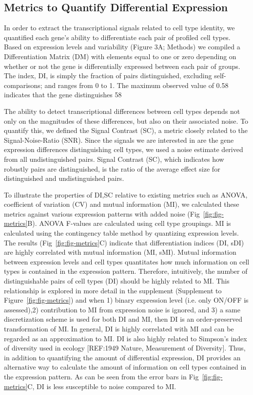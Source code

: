 \subsection{Metrics to Quantify Differential Expression}
In order to extract the transcriptional signals related to cell type identity, we quantified each gene's ability to differentiate each pair of profiled cell types. Based on expression levels and variability (Figure 3A; Methods) we compiled a Differentiation Matrix (DM) with elements equal to one or zero depending on whether or not the gene is differentially expressed between each pair of groups. The index, DI, is simply the fraction of pairs distinguished, excluding self-comparisons; and ranges from 0 to 1. The maximum observed value of 0.58 indicates that the gene distinguishes 58%

The ability to detect transcriptional differences between cell types depends not only on the magnitudes of these differences, but also on their associated noise. To quantify this, we defined the Signal Contrast (SC), a metric closely related to the Signal-Noise-Ratio (SNR). Since the signals we are interested in are the gene expression differences distinguishing cell types, we used a noise estimate derived from all undistinguished pairs. Signal Contrast (SC), which indicates how robustly pairs are distinguished, is the ratio of the average effect size for distinguished and undistinguished pairs. 

To illustrate the properties of DI,SC relative to existing metrics such as ANOVA, coefficient of variation (CV) and mutual information (MI), we calculated these metrics against various expression patterns with added noise (Fig~\ref{fig:fig-metrics}B). ANOVA F-values are calculated using cell type groupings. MI is calculated using the contingency table method by quantizing expression levels. 
The results (Fig~\ref{fig:fig-metrics}C) indicate that differentiation indices (DI, sDI) are highly correlated with mutual information (MI, sMI). Mutual information between expression levels and cell types quantitates how much information on cell types is contained in the expression pattern. Therefore, intuitively, the number of distinguishable pairs of cell types (DI) should be highly related to MI. This relationship is explored in more detail in the supplement (Supplement to Figure~\ref{fig:fig-metrics}) and when 1) binary expression level (i.e. only ON/OFF is assessed),2) contribution to MI from expression noise is ignored, and 3) a same discretization scheme is used for both DI and MI, then DI is an order-preserved transformation of MI. In general, DI is highly correlated with MI and can be regarded as an approximation to MI. DI is also highly related to Simpson's index of diversity used in ecology [REF:1949 Nature, Measurement of Diversity]. Thus, in addition to quantifying the amount of differential expression, DI provides an alternative way to calculate the amount of information on cell types contained in the expression pattern. As can be seen from the error bars in Fig~\ref{fig:fig-metrics}C, DI is less susceptible to noise compared to MI. 


